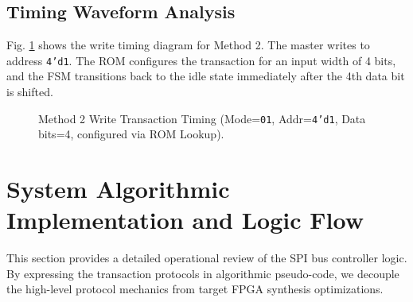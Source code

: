 \documentclass[conference]{IEEEtran}
\begin{document}
\subsection{Timing Waveform Analysis}
Fig. \ref{fig:timing_method2} shows the write timing diagram for Method 2. The master writes to address \texttt{4'd1}. The ROM configures the transaction for an input width of 4 bits, and the FSM transitions back to the idle state immediately after the 4th data bit is shifted.

\begin{figure}[htbp]
\centering
{}
\caption{Method 2 Write Transaction Timing (Mode=\texttt{01}, Addr=\texttt{4'd1}, Data bits=4, configured via ROM Lookup).}
\label{fig:timing_method2}
\end{figure}

\section{System Algorithmic Implementation and Logic Flow}
This section provides a detailed operational review of the SPI bus controller logic. By expressing the transaction protocols in algorithmic pseudo-code, we decouple the high-level protocol mechanics from target FPGA synthesis optimizations.
\end{document}
